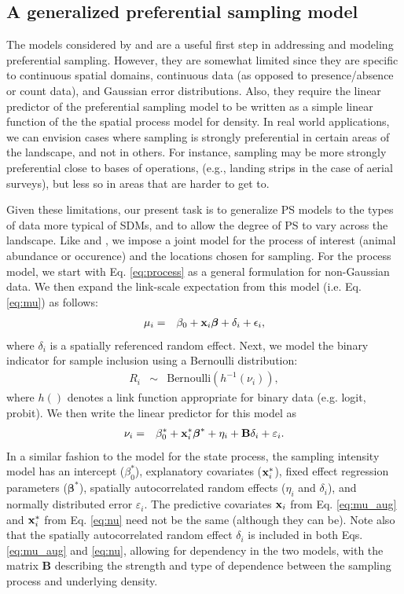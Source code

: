 \documentclass[times,mee,doublespace,]{besauth2}
\begin{document}
\subsection{A generalized preferential sampling model}

The models considered by \citet{DiggleEtAl2010} and \citet{PatiEtAl2011} are a useful first step in addressing and modeling preferential sampling.  However, they are somewhat limited since they are specific to continuous spatial domains, continuous data (as opposed to presence/absence or count data), and Gaussian error distributions.  Also, they require the linear predictor of the preferential sampling model to be written as a simple linear function of the the spatial process model for density.  In real world applications, we can envision cases where sampling is strongly preferential in certain areas of the landscape, and not in others.  For instance, sampling may be more strongly preferential close to bases of operations, (e.g., landing strips in the case of aerial surveys), but less so in areas that are harder to get to.  

Given these limitations, our present task is to generalize PS models to the types of data more typical of SDMs, and to allow the degree of PS to vary across the landscape.  Like \citet{DiggleEtAl2010} and \citet{PatiEtAl2011}, we impose a joint model for the process of interest (animal abundance or occurence) and the locations chosen for sampling. For the process model, we start with Eq. \ref{eq:process} as a general formulation for non-Gaussian data.  We then expand the link-scale expectation from this model
(i.e. Eq. \ref{eq:mu}) as follows:
\begin{eqnarray}
  \mu_i & = & \beta_0 + {\bf x}_i \boldsymbol{\beta}+\delta_i+\epsilon_i,
\label{eq:mu_aug}
\end{eqnarray}
where $\delta_i$ is a spatially referenced random effect.  Next, we model the binary indicator for sample inclusion using a Bernoulli distribution:
\begin{eqnarray}
  R_i & \sim & \text{Bernoulli}(h^{-1}(\nu_i)),
\end{eqnarray}
where $h()$ denotes a link function appropriate for binary data (e.g. logit, probit).  We then write the linear predictor for this model as
\begin{eqnarray}
  \nu_i & = & \beta_0^* + {\bf x}_i^* \boldsymbol{\beta}^*+\eta_i+{\bf B} \delta_i + \varepsilon_i.
\label{eq:nu}
\end{eqnarray}
 In a similar fashion to the model for the state process, the sampling intensity model has an intercept ($\beta_0^*$), explanatory covariates (${\bf x}_i^*$), fixed effect regression parameters ($\boldsymbol{\beta}^*$), spatially autocorrelated random effects ($\eta_i$ and $\delta_i$), and normally distributed error $\varepsilon_i$.  The predictive covariates ${\bf x}_i$ from Eq. \ref{eq:mu_aug} and ${\bf x}_i^*$ from Eq. \ref{eq:nu} need not be the same (although they can be).  Note also that the  spatially autocorrelated random effect $\delta_i$ is included in both Eqs. \ref{eq:mu_aug} and \ref{eq:nu}, allowing for dependency in the two models, with the matrix {\bf B} describing the strength and type of dependence between the sampling process and underlying density.
 
\end{document}
